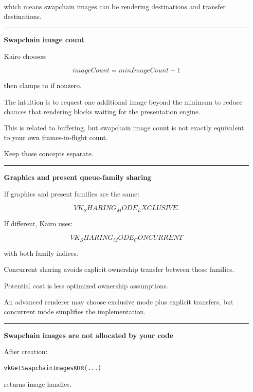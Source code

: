 which means swapchain images can be rendering destinations and transfer destinations.

\begin{center}\rule{0.5\linewidth}{0.5pt}\end{center}

\textbf{Swapchain image count}

Kairo chooses:

\[
imageCount=
minImageCount+1
\]

then clamps to  if nonzero.

The intuition is to request one additional image beyond the minimum to reduce chances that rendering blocks waiting for the presentation engine.

This is related to buffering, but swapchain image count is not exactly equivalent to your own frames-in-flight count.

Keep those concepts separate.

\begin{center}\rule{0.5\linewidth}{0.5pt}\end{center}

\textbf{Graphics and present queue-family sharing}

If graphics and present families are the same:

\[
VK_SHARING_MODE_EXCLUSIVE.
\]

If different, Kairo uses:

\[
VK_SHARING_MODE_CONCURRENT
\]

with both family indices.

Concurrent sharing avoids explicit ownership transfer between those families.

Potential cost is less optimized ownership assumptions.

An advanced renderer may choose exclusive mode plus explicit transfers, but concurrent mode simplifies the implementation.

\begin{center}\rule{0.5\linewidth}{0.5pt}\end{center}

\textbf{Swapchain images are not allocated by your code}

After creation:

\begin{verbatim}
vkGetSwapchainImagesKHR(...)
\end{verbatim}

returns image handles.

